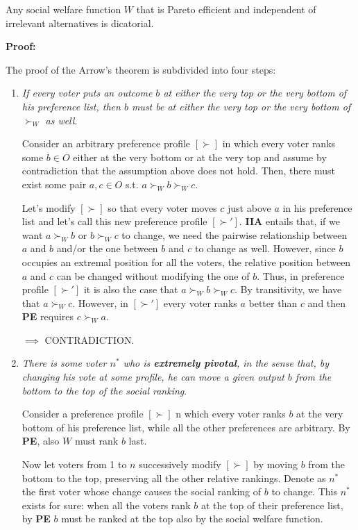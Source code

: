 \documentclass[pt11,a4paper,twoside,reqno,openright]{paper}
\begin{document}
\noindent Any social welfare function $W$ that is Pareto efficient and 
independent of irrelevant alternatives is dicatorial.

\bigskip
\noindent \textbf{Proof:}

\noindent The proof of the Arrow's theorem is subdivided into four steps:
\begin{enumerate}
	\item \textit{If every voter puts an outcome $b$ at either the very top or 
	the very bottom of his preference list, then $b$ must be at either the very 
	top or the very bottom of $\succ_W$ as well}.

	\noindent Consider an arbitrary preference profile $[\succ]$ in which every 
	voter ranks some $b \in O$ either at the very bottom or at the very top and 
	assume by contradiction that the assumption above does not hold. Then, there 
	must exist some pair $a,c \in O$ s.t. $a \succ_W b \succ_W c$.

	\noindent Let's modify $[\succ]$ so that every voter moves $c$ just above 
	$a$ in his preference list and let's call this new preference profile 
	$[\succ']$. \textbf{IIA} entails that, if we want $a \succ_W b$ or $b 
	\succ_W c$ to change, we need the pairwise relationship between $a$ and $b$ 
	and/or the one between $b$ and $c$ to change as well. However, since $b$ 
	occupies an extremal position for all the voters, the relative position 
	between $a$ and $c$ can be changed without modifying the one of $b$. Thus, 
	in preference profile $[\succ']$ it is also the case that $a \succ_W b 
	\succ_W c$. By transitivity, we have that $a \succ_W c$. However, in 
	$[\succ']$ every voter ranks $a$ better than $c$ and then \textbf{PE} 
	requires $c \succ_W a$.

	\noindent $\implies$ CONTRADICTION.

	\item \textit{There is some voter $n^*$ who is \textbf{extremely pivotal}, 
	in the sense that, by changing his vote at some profile, he can move a 
	given output $b$ from the bottom to the top of the social ranking}.

	\noindent Consider a preference profile $[\succ]$ n which every voter ranks 
	$b$ at the very bottom of his preference list, while all the other 
	preferences are arbitrary. By \textbf{PE}, also $W$ must rank $b$ last.

	\noindent Now let voters from 1 to $n$ successively modify $[\succ]$ by 
	moving $b$ from the bottom to the top, preserving all the other relative 
	rankings. Denote as $n^*$ the first voter whose change causes the social 
	ranking of $b$ to change. This $n^*$ exists for sure: when all the voters 
	rank $b$ at the top of their preference list, by \textbf{PE} $b$ must be 
	ranked at the top also by the social welfare function.


\end{enumerate}
\end{document}
